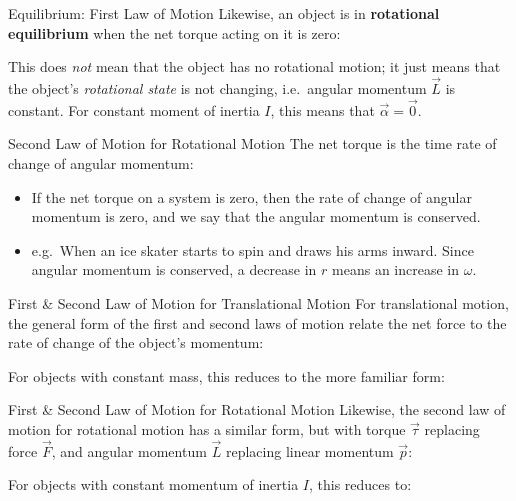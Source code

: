 \documentclass[12pt,compress,aspectratio=169]{beamer}
\begin{document}
\begin{frame}{Equilibrium: First Law of Motion}
  Likewise, an object is in \textbf{rotational equilibrium} when the net torque
  acting on it is zero:

  
  This does \emph{not} mean that the object has no rotational motion; it just
  means that the object's \emph{rotational state} is not changing, i.e.\
  angular momentum $\vec L$ is constant. For constant moment of inertia $I$,
  this means that $\vec\alpha=\vec 0$.
\end{frame}



\begin{frame}{Second Law of Motion for Rotational Motion}
  The net torque is the time rate of change of angular momentum:

  \begin{itemize}
  \item If the net torque on a system is zero, then the rate of change
    of angular momentum is zero, and we say that the angular momentum is
    conserved. 
  \item e.g.\ When an ice skater starts to spin and draws his arms inward.
    Since angular momentum is conserved, a decrease in $r$ means an
    increase in $\omega$.
  \end{itemize}
\end{frame}



\begin{frame}{First \& Second Law of Motion for Translational Motion}
  For translational motion, the general form of the first and second laws of
  motion relate the net force to the rate of change of the object's momentum:


  For objects with constant mass, this reduces to the more familiar form:

\end{frame}



\begin{frame}{First \& Second Law of Motion for Rotational Motion}
  Likewise, the second law of motion for rotational motion has a similar form,
  but with torque $\vec\tau$ replacing force $\vec F$, and angular momentum
  $\vec L$ replacing linear momentum $\vec p$:


  For objects with constant momentum of inertia $I$, this reduces to:

\end{frame}
\end{document}
